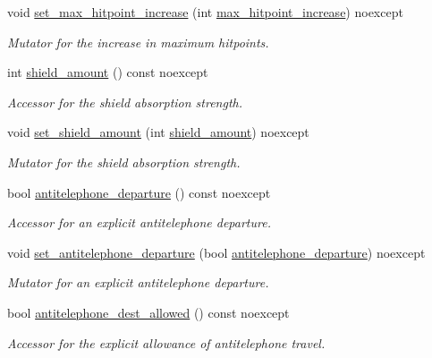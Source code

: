 \begin{DoxyCompactItemize}
void \hyperlink{classitem_1_1_effect_af2710ca17d043b8aeb3360fd991e3140}{set\+\_\+max\+\_\+hitpoint\+\_\+increase} (int \hyperlink{classitem_1_1_effect_ad74a155925b8072030afabf3bb13ba4a}{max\+\_\+hitpoint\+\_\+increase}) noexcept
\begin{DoxyCompactList}\small\item\em Mutator for the increase in maximum hitpoints. \end{DoxyCompactList}\item 
int \hyperlink{classitem_1_1_effect_a9a6f54d0eab7dd13b2ef14e04f6ddb56}{shield\+\_\+amount} () const noexcept
\begin{DoxyCompactList}\small\item\em Accessor for the shield absorption strength. \end{DoxyCompactList}\item 
void \hyperlink{classitem_1_1_effect_a1610df003ab26e8ce4aafc5a13543e86}{set\+\_\+shield\+\_\+amount} (int \hyperlink{classitem_1_1_effect_a9a6f54d0eab7dd13b2ef14e04f6ddb56}{shield\+\_\+amount}) noexcept
\begin{DoxyCompactList}\small\item\em Mutator for the shield absorption strength. \end{DoxyCompactList}\item 
bool \hyperlink{classitem_1_1_effect_abd1c6fcf2c430da628787c535cdeb527}{antitelephone\+\_\+departure} () const noexcept
\begin{DoxyCompactList}\small\item\em Accessor for an explicit antitelephone departure. \end{DoxyCompactList}\item 
void \hyperlink{classitem_1_1_effect_a209135cb3afb7f25dfd56c5b7c9e2ffd}{set\+\_\+antitelephone\+\_\+departure} (bool \hyperlink{classitem_1_1_effect_abd1c6fcf2c430da628787c535cdeb527}{antitelephone\+\_\+departure}) noexcept
\begin{DoxyCompactList}\small\item\em Mutator for an explicit antitelephone departure. \end{DoxyCompactList}\item 
bool \hyperlink{classitem_1_1_effect_acb90e76e736868dd5307e8b6fe7e2e0d}{antitelephone\+\_\+dest\+\_\+allowed} () const noexcept
\begin{DoxyCompactList}\small\item\em Accessor for the explicit allowance of antitelephone travel. \end{DoxyCompactList}\item 

\end{DoxyCompactItemize}
